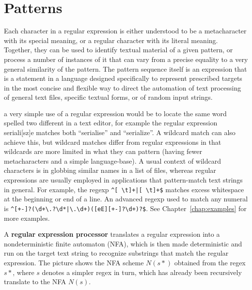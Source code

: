 \chapter{Patterns}
\label{chap:patterns}

Each character in a regular expression is either understood to be a
metacharacter with its special meaning, or a regular character with
its literal meaning. Together, they can be used to identify textual
material of a given pattern, or process a number of instances of it
that can vary from a precise equality to a very general similarity of
the pattern. The pattern sequence itself is an expression that is a
statement in a language designed specifically to represent prescribed
targets in the most concise and flexible way to direct the automation
of text processing of general text files, specific textual forms, or
of random input strings.

a very simple use of a regular expression would be to locate the same
word spelled two different %
in a text editor, for example the regular expression
\textsf{seriali[sz]e} matches both ``serialise'' and ``serialize''. A
wildcard match can also achieve this, but wildcard matches differ from
regular expressions in that wildcards are more limited in what they
can pattern (having fewer metacharacters and a simple
language-base). A usual context of wildcard characters is in globbing
similar names in a list of files, whereas regular expressions are
usually employed in applications that pattern-match text strings in
general. For example, the regexp \verb-^[ \t]+|[ \t]+$- matches excess
whitespace at the beginning or end of a line. An advanced regexp used
to match any numeral is
\verb/^[+-]?(\d+\.?\d*|\.\d+)([eE][+-]?\d+)?$/. See
 Chapter~\ref{chap:examples} for more examples.

A \textbf{regular expression processor} translates a regular
expression into a nondeterministic finite automaton (NFA), which is
then made deterministic and run on the target text string to recognize
substrings that match the regular expression. The picture shows the
NFA scheme $N(s*)$ obtained from the regex $s*$, where
$s$ denotes a simpler regex in turn, which has already been
recursively translate to the NFA $N(s)$.
